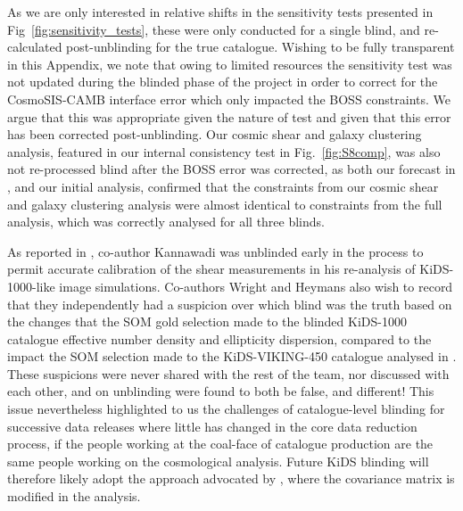 \begin{appendix}
As we are only interested in relative shifts in the sensitivity tests presented in Fig~\ref{fig:sensitivity_tests}, these were only conducted for a single blind, and re-calculated post-unblinding for the true catalogue.  Wishing to be fully transparent in this Appendix, we note that owing to limited resources the sensitivity test was not updated during the blinded phase of the project in order to correct for the {\sc CosmoSIS-CAMB} interface error which only impacted the BOSS constraints.   We argue that this was appropriate given the nature of test and given that this error has been corrected post-unblinding.    Our cosmic shear and galaxy clustering analysis, featured in our internal consistency test in Fig.~\ref{fig:S8comp}, was also not re-processed blind after the BOSS error was corrected, as both our forecast in \citet{joachimi/etal:inprep}, and our initial analysis, confirmed that the constraints from our cosmic shear and galaxy clustering analysis were almost identical to constraints from the full \tttp analysis, which was correctly analysed for all three blinds.

As reported in \citet{giblin/etal:inprep}, co-author Kannawadi was unblinded early in the process to permit accurate calibration of the shear measurements in his re-analysis of KiDS-1000-like image simulations.   Co-authors Wright and Heymans also wish to record that they independently had a suspicion over which blind was the truth based on the changes that the SOM gold selection made to the blinded KiDS-1000 catalogue effective number density and ellipticity dispersion, compared to the impact the SOM selection made to the KiDS-VIKING-450 catalogue analysed in \citet{wright/etal:2020b}.  These suspicions were never shared with the rest of the team, nor discussed with each other, and on unblinding were found to both be false, and different!   This issue nevertheless highlighted to us the challenges of catalogue-level blinding for successive data releases where little has changed in the core data reduction process, if the people working at the coal-face of catalogue production are the same people working on the cosmological analysis.   Future KiDS blinding will therefore likely adopt the approach advocated by \citet{sellentin:2020}, where the covariance matrix is modified in the analysis.


\end{appendix}